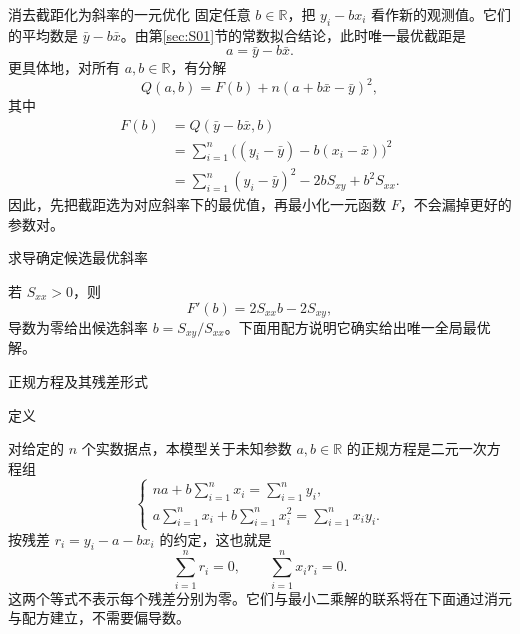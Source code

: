 \documentclass[aspectratio=169,10pt,fontset=fandol]{ctexbeamer}
\begin{document}
\begin{frame}[t,fragile]{消去截距化为斜率的一元优化}
\footnotesize
{\footnotesize
固定任意 $b\in\mathbb{R}$，把 $y_i-bx_i$ 看作新的观测值。它们的平均数是 $\bar{y}-b\bar{x}$。由第\ref{sec:S01}节的常数拟合结论，此时唯一最优截距是
\[
a=\bar{y}-b\bar{x}.
\]
更具体地，对所有 $a,b\in\mathbb{R}$，有分解
\[
Q(a,b)=F(b)+n(a+b\bar{x}-\bar{y})^2,
\]
其中
\[
\begin{aligned}
F(b)&=Q(\bar{y}-b\bar{x},b)\\
&=\sum_{i=1}^{n}\bigl((y_i-\bar{y})-b(x_i-\bar{x})\bigr)^2\\
&=\sum_{i=1}^{n}(y_i-\bar{y})^2-2bS_{xy}+b^2S_{xx}.
\end{aligned}
\]
因此，先把截距选为对应斜率下的最优值，再最小化一元函数 $F$，不会漏掉更好的参数对。
}
\end{frame}
\begin{frame}[t,fragile]{求导确定候选最优斜率}
\footnotesize
{\footnotesize
若 $S_{xx}>0$，则
\[
F'(b)=2S_{xx}b-2S_{xy},
\]
导数为零给出候选斜率 $b=S_{xy}/S_{xx}$。下面用配方说明它确实给出唯一全局最优解。\par

}
\end{frame}
\begin{frame}[t,fragile]{正规方程及其残差形式}
\footnotesize
\begin{block}{定义}
{\footnotesize
对给定的 $n$ 个实数据点，本模型关于未知参数 $a,b\in\mathbb{R}$ 的正规方程是二元一次方程组
\[
\begin{cases}
na+b\displaystyle\sum_{i=1}^{n}x_i=\displaystyle\sum_{i=1}^{n}y_i,\\
a\displaystyle\sum_{i=1}^{n}x_i+b\displaystyle\sum_{i=1}^{n}x_i^2=\displaystyle\sum_{i=1}^{n}x_i y_i.
\end{cases}
\]
按残差 $r_i=y_i-a-bx_i$ 的约定，这也就是
\[
\sum_{i=1}^{n}r_i=0,\qquad \sum_{i=1}^{n}x_i r_i=0.
\]
这两个等式不表示每个残差分别为零。它们与最小二乘解的联系将在下面通过消元与配方建立，不需要偏导数。

}
\end{block}
\end{frame}
\end{document}
